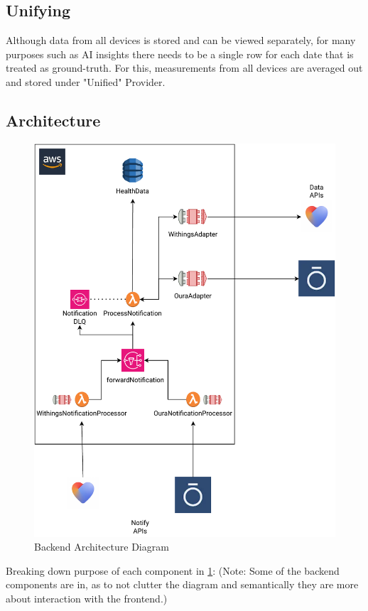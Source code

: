 \subsection{Unifying}
Although data from all devices is stored and can be viewed separately, for many purposes such as AI insights there needs to be a single row for each date that is treated as ground-truth. For this, measurements from all devices are averaged out and stored under "Unified" Provider. 
\subsection{Architecture}
\begin{figure}
    
    \centering
    \includegraphics[width=\textwidth,height=\textheight,keepaspectratio]{../images/backend.pdf}
    \caption{Backend Architecture Diagram}
    \label{fig:backend}
    
\end{figure}
Breaking down purpose of each component in \ref{fig:backend}: (Note: Some of the backend components are in, as to not clutter the diagram and semantically they are more about interaction with the frontend.)
